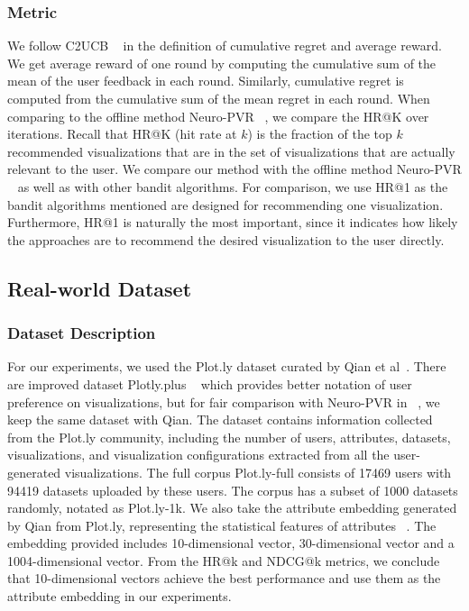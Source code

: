 \subsubsection{Metric}
We follow C2UCB ~\cite{qin_contextual_2014} in the definition of cumulative regret and average reward. 
We get average reward of one round by computing the cumulative sum of the mean of the user feedback in each round. Similarly, cumulative regret is computed from the cumulative sum of the mean regret in each round. 
When comparing to the offline method Neuro-PVR ~\cite{qian_personalized_2021}, we compare the HR@K over iterations. 
Recall that HR@K (hit rate at $k$) is the fraction of the top $k$ recommended visualizations that are in the set of visualizations that are actually relevant to the user. 
We compare our method with the offline method Neuro-PVR ~\cite{qian_personalized_2021} as well as with other bandit algorithms.
For comparison, we use HR@1 as the bandit algorithms mentioned are designed for recommending one visualization.
Furthermore, HR@1 is naturally the most important, since it indicates how likely the approaches are to recommend the desired visualization to the user directly.

\subsection{Real-world Dataset}

\subsubsection{Dataset Description}
For our experiments, we used the Plot.ly dataset curated by Qian et al~\cite{qian_personalized_2021}. There are improved dataset Plotly.plus ~\cite{podo2022plotly} which provides better notation of user preference on visualizations, but for fair comparison with Neuro-PVR in ~\cite{qian_personalized_2021}, we keep the same dataset with Qian. The dataset contains information collected from the Plot.ly community, including the number of users, attributes, datasets, visualizations, and visualization configurations extracted from all the user-generated visualizations. The full corpus Plot.ly-full consists of 17469 users with 94419 datasets uploaded by these users. The corpus has a subset of 1000 datasets randomly, notated as Plot.ly-1k. We also take the attribute embedding generated by Qian from Plot.ly, representing the statistical features of attributes ~\cite{qian_personalized_2021}. The embedding provided includes 10-dimensional vector, 30-dimensional vector and a 1004-dimensional vector. 
From the HR@k and NDCG@k metrics, we conclude that 10-dimensional vectors achieve the best performance and use them as the attribute embedding in our experiments.

